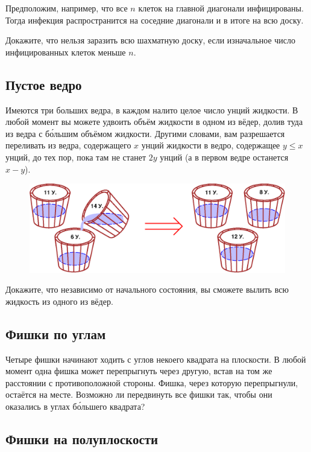 Предположим, например, что все $n$ клеток на главной диагонали инфицированы.
Тогда инфекция распространится на соседние диагонали и в итоге на всю доску.

Докажите, что нельзя заразить всю шахматную доску, если изначальное число инфицированных клеток меньше $n$.

\subsection*{Пустое ведро}%

Имеются три больших ведра, в каждом налито целое число унций жидкости.
В любой момент вы можете удвоить объём жидкости в одном из вёдер, долив туда из ведра с б\'{о}льшим объёмом жидкости.
Другими словами, вам разрешается переливать из ведра, содержащего $x$ унций жидкости в ведро, содержащее 
$y\le x$ унций, до тех пор, пока там не станет $2y$ унций (а в первом ведре останется $x-y$).

\begin{figure}[h!]
\centering
\includegraphics[scale=0.6]{Figs/Algorithms/buckets-ru}
\end{figure}

Докажите, что независимо от начального состояния, вы сможете вылить всю жидкость из одного из вёдер.

\subsection*{Фишки по углам}%

Четыре фишки начинают ходить с углов некоего квадрата на плоскости.
В любой момент одна фишка может перепрыгнуть через другую,
встав на том же расстоянии с противоположной стороны.
Фишка, через которую перепрыгнули, остаётся на месте.
Возможно ли передвинуть все фишки так, чтобы они оказались в углах б\'{о}льшего квадрата?

\subsection*{Фишки на полуплоскости}%

